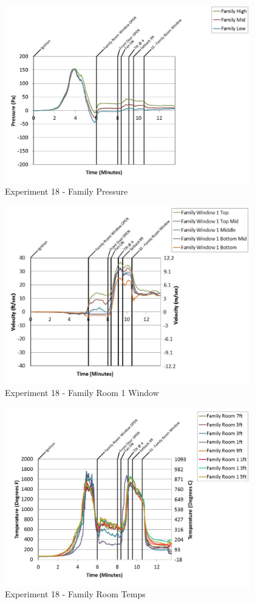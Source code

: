 \documentclass{article}
\begin{document}
\begin{appendices}
	\clearpage

	\begin{figure}[h!]
		\centering
		\includegraphics[height=3.05in]{0_Images/Results_Charts/Exp_18_Charts/FamilyPressure.pdf}
		\caption{Experiment 18 - Family Pressure}
	\end{figure}
 

	\begin{figure}[h!]
		\centering
		\includegraphics[height=3.05in]{0_Images/Results_Charts/Exp_18_Charts/FamilyRoom1Window.pdf}
		\caption{Experiment 18 - Family Room 1 Window}
	\end{figure}
 
	\clearpage

	\begin{figure}[h!]
		\centering
		\includegraphics[height=3.05in]{0_Images/Results_Charts/Exp_18_Charts/FamilyRoomTemps.pdf}
		\caption{Experiment 18 - Family Room Temps}
	\end{figure}
 


\end{appendices}
\end{document}
